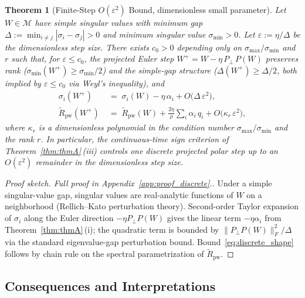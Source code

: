 \documentclass{article}
\newtheorem{theorem}{Theorem}
\begin{document}
\begin{theorem}[Finite-Step $O(\varepsilon^2)$ Bound, dimensionless small parameter]
\label{thm:discrete}
Let $W\in\mathcal M$ have simple singular values with minimum gap $\Delta:=\min_{i\neq j}|\sigma_i-\sigma_j|>0$ and minimum singular value $\sigma_{\min}>0$. Let $\varepsilon:=\eta/\Delta$ be the dimensionless step size. There exists $c_0>0$ depending only on $\sigma_{\max}/\sigma_{\min}$ and $r$ such that, for $\varepsilon\leq c_0$, the projected Euler step $W^+=W-\eta\,P_\perp\,P(W)$ preserves rank ($\sigma_{\min}(W^+)\geq \sigma_{\min}/2$) and the simple-gap structure ($\Delta(W^+)\geq\Delta/2$, both implied by $\varepsilon\leq c_0$ via Weyl's inequality), and
\begin{align}
\sigma_i(W^+) &\;=\; \sigma_i(W)-\eta\,\alpha_i + O\!\bigl(\Delta\,\varepsilon^2\bigr), \label{eq:discrete_sv}\\
\widetilde R_{\mathrm{pw}}(W^+) &\;=\; \widetilde R_{\mathrm{pw}}(W) + \frac{2\eta}{\rho}\sum_i\alpha_i\,q_i + O\!\bigl(\kappa_r\,\varepsilon^2\bigr), \label{eq:discrete_shape}
\end{align}
where $\kappa_r$ is a dimensionless polynomial in the condition number $\sigma_{\max}/\sigma_{\min}$ and the rank $r$. In particular, the continuous-time sign criterion of Theorem~\ref{thm:thmA}\,(iii) controls one discrete projected polar step up to an $O(\varepsilon^2)$ remainder in the dimensionless step size.
\end{theorem}

\begin{proof}[Proof sketch. Full proof in Appendix~\ref{app:proof_discrete}.]
Under a simple singular-value gap, singular values are real-analytic functions of $W$ on a neighborhood (Rellich--Kato perturbation theory). Second-order Taylor expansion of $\sigma_i$ along the Euler direction $-\eta P_\perp P(W)$ gives the linear term $-\eta\alpha_i$ from Theorem~\ref{thm:thmA}\,(i); the quadratic term is bounded by $\|P_\perp P(W)\|_F^2/\Delta$ via the standard eigenvalue-gap perturbation bound. Bound~\eqref{eq:discrete_shape} follows by chain rule on the spectral parametrization of $\widetilde R_{\mathrm{pw}}$.
\end{proof}

\subsection{Consequences and Interpretations}
\label{sec:theory:corollaries}
\end{document}
